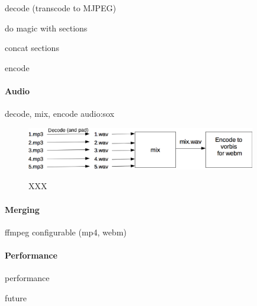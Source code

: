 \documentclass[twoside,openright,a4paper,12pt,english]{article}
\begin{document}
decode (transcode to MJPEG)

do magic with sections

concat sections

encode

\paragraph*{Audio}
decode, mix, encode
audio:sox
\begin{figure}[h]
    \includegraphics[width=10cm]{./pics/audio-popro.eps}
    \label{diagram-sync}
    \caption{XXX}
\end{figure}


\paragraph*{Merging}
ffmpeg
configurable (mp4, webm)

\paragraph*{Performance}
performance


future
\end{document}
